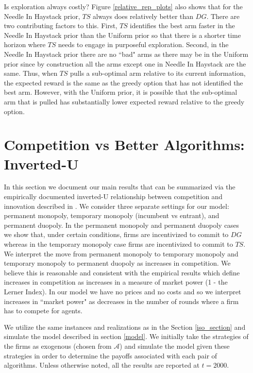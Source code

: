 \documentclass{article}
\theoremstyle{definition}
\begin{document}
Is exploration always costly? Figure \ref{relative_rep_plots} also shows that for the Needle In Haystack prior, $TS$ always does relatively better than $DG$. There are two contributing factors to this. First, $TS$ identifies the best arm faster in the Needle In Haystack prior than the Uniform prior so that there is a shorter time horizon where $TS$ needs to engage in purposeful exploration. Second, in the Needle In Haystack prior there are no ``bad" arms as there may be in the Uniform prior since by construction all the arms except one in Needle In Haystack are the same. Thus, when $TS$ pulls a sub-optimal arm relative to its current information, the expected reward is the same as the greedy option that has not identified the best arm. However, with the Uniform prior, it is possible that the sub-optimal arm that is pulled has substantially lower expected reward relative to the greedy option.

\section{Competition vs Better Algorithms: Inverted-U}

In this section we document our main results that can be summarized via the empirically documented inverted-U relationship between competition and innovation described in \citet{aghion2005competition}. We consider three separate settings for our model: permanent monopoly, temporary monopoly (incumbent vs entrant), and permanent duopoly. In the permanent monopoly and permanent duopoly cases we show that, under certain conditions, firms are incentivized to commit to $DG$ whereas in the temporary monopoly case firms are incentivized to commit to $TS$. We interpret the move from permanent monopoly to temporary monopoly and temporary monopoly to permanent duopoly as increases in competition. We believe this is reasonable and consistent with the empirical results which define increases in competition as increases in a measure of market power (1 - the Lerner Index). In our model we have no prices and no costs and so we interpret increases in ``market power" as decreases in the number of rounds where a firm has to compete for agents.

We utilize the same instances and realizations as in the Section \ref{iso_section} and simulate the model described in section \ref{model}. We initially take the strategies of the firms as exogenous (chosen from $\mathcal{A}$) and simulate the model given these strategies in order to determine the payoffs associated with each pair of algorithms. Unless otherwise noted, all the results are reported at $t = 2000$.
\end{document}

